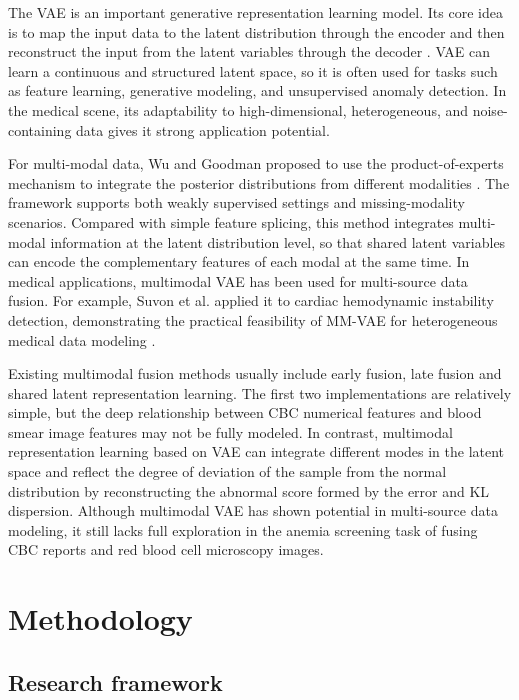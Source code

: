 \documentclass[conference]{IEEEtran}
\begin{document}
The VAE is an important generative representation learning model. Its core idea is to map the input data to the latent distribution through the encoder and then reconstruct the input from the latent variables through the decoder \cite{ref8}. VAE can learn a continuous and structured latent space, so it is often used for tasks such as feature learning, generative modeling, and unsupervised anomaly detection. In the medical scene, its adaptability to high-dimensional, heterogeneous, and noise-containing data gives it strong application potential.

For multi-modal data, Wu and Goodman proposed to use the product-of-experts mechanism to integrate the posterior distributions from different modalities \cite{ref9}. The framework supports both weakly supervised settings and missing-modality scenarios. Compared with simple feature splicing, this method integrates multi-modal information at the latent distribution level, so that shared latent variables can encode the complementary features of each modal at the same time. In medical applications, multimodal VAE has been used for multi-source data fusion. For example, Suvon et al. applied it to cardiac hemodynamic instability detection, demonstrating the practical feasibility of MM-VAE for heterogeneous medical data modeling \cite{ref10}.

Existing multimodal fusion methods usually include early fusion, late fusion and shared latent representation learning. The first two implementations are relatively simple, but the deep relationship between CBC numerical features and blood smear image features may not be fully modeled. In contrast, multimodal representation learning based on VAE can integrate different modes in the latent space and reflect the degree of deviation of the sample from the normal distribution by reconstructing the abnormal score formed by the error and KL dispersion. Although multimodal VAE has shown potential in multi-source data modeling, it still lacks full exploration in the anemia screening task of fusing CBC reports and red blood cell microscopy images.

\section{Methodology}

\subsection{Research framework}
\end{document}

